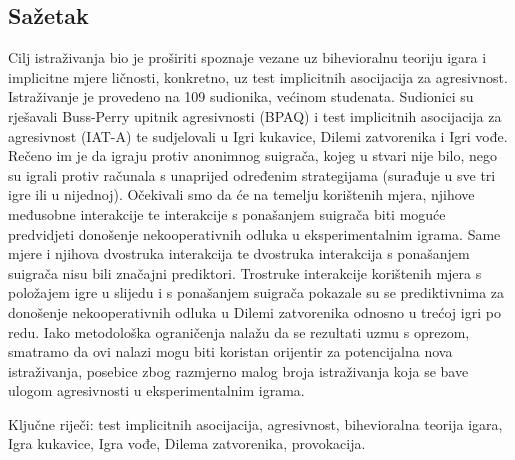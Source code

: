 \documentclass[a4paper, 12pt]{report}
\newcommand{\nocontentsline}[3]{}
\newcommand{\tocless}[2]{\bgroup\let\addcontentsline=\nocontentsline#1{#2}\egroup}
\begin{document}
\begin{singlespace}
    \tocless\section{Sažetak}

Cilj istraživanja bio je proširiti spoznaje vezane uz bihevioralnu teoriju igara i
implicitne mjere ličnosti, konkretno, uz
test implicitnih asocijacija za agresivnost. Istraživanje je provedeno na 109
sudionika, većinom studenata. Sudionici su rješavali Buss-Perry upitnik
agresivnosti (BPAQ) i test implicitnih asocijacija za agresivnost (IAT-A) te
sudjelovali u Igri kukavice, Dilemi zatvorenika i Igri vođe. Rečeno im je da
igraju protiv anonimnog suigrača, kojeg u stvari nije bilo, nego su igrali
protiv računala s unaprijed određenim strategijama (surađuje u sve tri igre ili u
nijednoj). Očekivali smo da će na temelju korištenih mjera, njihove međusobne
interakcije te interakcije s ponašanjem suigrača biti moguće predvidjeti
donošenje nekooperativnih odluka u eksperimentalnim igrama. Same mjere i njihova
dvostruka interakcija te dvostruka interakcija s ponašanjem suigrača nisu bili
značajni prediktori. Trostruke interakcije korištenih mjera s položajem igre u
slijedu i s ponašanjem suigrača pokazale su se prediktivnima za donošenje
nekooperativnih odluka u Dilemi zatvorenika odnosno u trećoj igri po redu.
Iako metodološka ograničenja nalažu da se rezultati uzmu s oprezom, smatramo da 
ovi nalazi mogu biti koristan orijentir za potencijalna nova istraživanja,
posebice zbog razmjerno malog broja istraživanja koja se bave ulogom
agresivnosti u eksperimentalnim igrama.
\bigskip

\noindent Ključne riječi: test implicitnih asocijacija, agresivnost, 
bihevioralna teorija igara, Igra kukavice, Igra vođe, Dilema zatvorenika, provokacija.

\tocless\section{Summary}


\end{singlespace}
\end{document}
